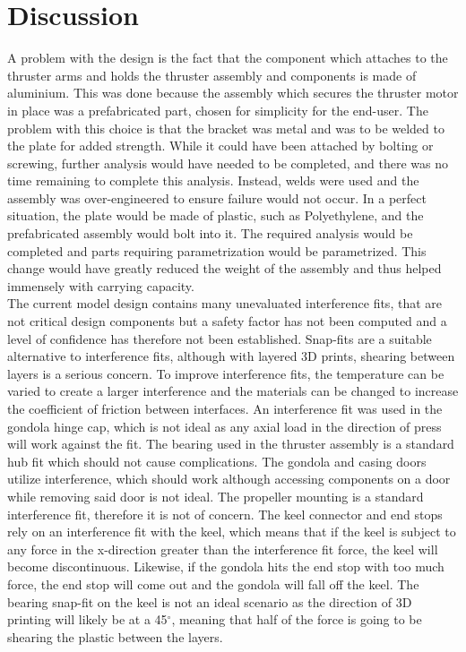 \documentclass[../main.tex]{subfiles}
\begin{document}
\chapter{Discussion}
A problem with the design is the fact that the component which attaches to the thruster arms and holds the thruster assembly and components is made of aluminium. This was done because the assembly which secures the thruster motor in place was a prefabricated part, chosen for simplicity for the end-user. The problem with this choice is that the bracket was metal and was to be welded to the plate for added strength. While it could have been attached by bolting or screwing, further analysis would have needed to be completed, and there was no time remaining to complete this analysis. Instead, welds were used and the assembly was over-engineered to ensure failure would not occur. In a perfect situation, the plate would be made of plastic, such as Polyethylene, and the prefabricated assembly would bolt into it. The required analysis would be completed and parts requiring parametrization would be parametrized. This change would have greatly reduced the weight of the assembly and thus helped immensely with carrying capacity.\\

The current model design contains many unevaluated interference fits, that are not critical design components but a safety factor has not been computed and a level of confidence has therefore not been established. Snap-fits are a suitable alternative to interference fits, although with layered 3D prints, shearing between layers is a serious concern. To improve interference fits, the temperature can be varied to create a larger interference and the materials can be changed to increase the coefficient of friction between interfaces. An interference fit was used in the gondola hinge cap, which is not ideal as any axial load in the direction of press will work against the fit. The bearing used in the thruster assembly is a standard hub fit which should not cause complications. The gondola and casing doors utilize interference, which should work although accessing components on a door while removing said door is not ideal.  The propeller mounting is a standard interference fit, therefore it is not of concern. The keel connector and end stops rely on an interference fit with the keel, which means that if the keel is subject to any force in the x-direction greater than the interference fit force, the keel will become discontinuous. Likewise, if the gondola hits the end stop with too much force, the end stop will come out and the gondola will fall off the keel. The bearing snap-fit on the keel is not an ideal scenario as the direction of 3D printing will likely be at a 45$^{\circ}$, meaning that half of the force is going to be shearing the plastic between the layers.\\
\end{document}
